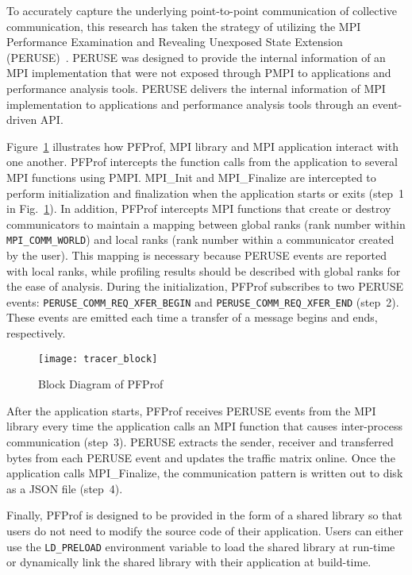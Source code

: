 To accurately capture the underlying point-to-point communication of
collective communication, this research has taken the strategy of utilizing
the MPI Performance Examination and Revealing Unexposed State Extension
(PERUSE)~\autocite{Jones2006}. PERUSE was designed to provide the internal
information of an MPI implementation that were not exposed through PMPI to
applications and performance analysis tools. PERUSE delivers the internal
information of MPI implementation to applications and performance analysis
tools through an event-driven API\@.

Figure~\ref{fig:profiler-block} illustrates how PFProf, MPI library and MPI
application interact with one another. PFProf intercepts the function calls
from the application to several MPI functions using PMPI\@. MPI\_Init and
MPI\_Finalize are intercepted to perform initialization and finalization when
the application starts or exits (step~1 in Fig.~\ref{fig:profiler-block}). In
addition, PFProf intercepts MPI functions that create or destroy communicators
to maintain a mapping between global ranks (rank number within
\lstinline!MPI_COMM_WORLD!) and local ranks (rank number within a communicator
created by the user). This mapping is necessary because PERUSE events are
reported with local ranks, while profiling results should be described with
global ranks for the ease of analysis. During the initialization, PFProf
subscribes to two PERUSE events: \lstinline!PERUSE_COMM_REQ_XFER_BEGIN! and
\lstinline!PERUSE_COMM_REQ_XFER_END! (step~2). These events are emitted each
time a transfer of a message begins and ends, respectively.

\begin{figure}
    \centering
    \texttt{[image: tracer\_block]}
    \caption{Block Diagram of PFProf}%
    \label{fig:profiler-block}
\end{figure}

After the application starts, PFProf receives PERUSE events from the MPI
library every time the application calls an MPI function that causes
inter-process communication (step~3). PERUSE extracts the sender, receiver and
transferred bytes from each PERUSE event and updates the traffic matrix
online. Once the application calls MPI\_Finalize, the communication pattern is
written out to disk as a JSON file (step~4).

Finally, PFProf is designed to be provided in the form of a shared library so
that users do not need to modify the source code of their application. Users
can either use the \lstinline!LD_PRELOAD! environment variable to load the
shared library at run-time or dynamically link the shared library with their
application at build-time.

